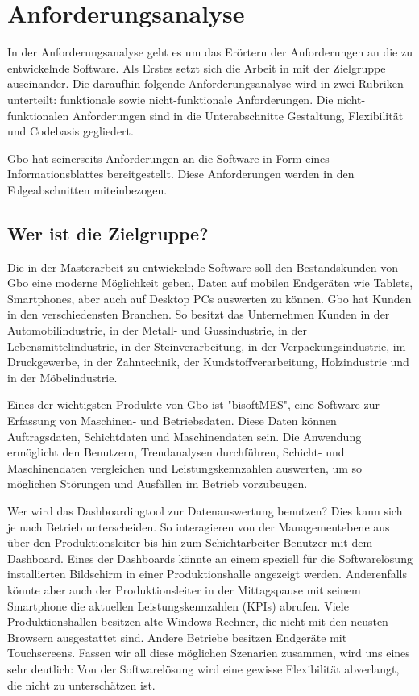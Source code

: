 \chapter{Anforderungsanalyse}
\label{chap:anforderungsanalyse}

In der Anforderungsanalyse geht es um das Erörtern der Anforderungen an die zu entwickelnde Software.
Als Erstes setzt sich die Arbeit in  mit der
Zielgruppe auseinander. Die daraufhin folgende Anforderungsanalyse wird in zwei
Rubriken unterteilt: funktionale sowie nicht-funktionale Anforderungen. Die
nicht-funktionalen Anforderungen sind in die Unterabschnitte Gestaltung, Flexibilität
und Codebasis gegliedert.

Gbo hat seinerseits Anforderungen an die Software in Form eines Informationsblattes
bereitgestellt. Diese Anforderungen werden in den Folgeabschnitten miteinbezogen.

\section{Wer ist die Zielgruppe?}
\label{sec:weristmeinezielgruppe}
Die in der Masterarbeit zu entwickelnde Software
soll den Bestandskunden von Gbo eine moderne Möglichkeit geben, Daten 
auf mobilen Endgeräten wie Tablets, Smartphones, aber auch auf Desktop PCs auswerten zu können.
Gbo hat Kunden in den verschiedensten Branchen. So besitzt das Unternehmen
Kunden in der Automobilindustrie, in der Metall- und Gussindustrie, in der Lebensmittelindustrie,
in der Steinverarbeitung, in der Verpackungsindustrie, im Druckgewerbe, in der
Zahntechnik, der Kundstoffverarbeitung, Holzindustrie und in der Möbelindustrie.\cite{GBODatacompBranchenloesungen}

Eines der wichtigsten Produkte von Gbo ist "bisoftMES", eine Software zur Erfassung von
Maschinen- und Betriebsdaten. Diese Daten können Auftragsdaten, Schichtdaten und Maschinendaten sein.
Die Anwendung ermöglicht den Benutzern, Trendanalysen durchführen, Schicht- und Maschinendaten vergleichen und
Leistungskennzahlen auswerten, um so möglichen Störungen und Ausfällen im Betrieb vorzubeugen.

Wer wird das Dashboardingtool zur Datenauswertung benutzen? Dies kann sich je nach Betrieb unterscheiden. So interagieren von der
Managementebene aus über den Produktionsleiter bis hin zum Schichtarbeiter Benutzer mit dem
Dashboard. Eines der Dashboards könnte an einem speziell für die Softwarelösung
installierten Bildschirm in einer Produktionshalle angezeigt werden. Anderenfalls könnte aber
auch der Produktionsleiter in der Mittagspause mit seinem Smartphone die aktuellen Leistungskennzahlen 
(KPIs) abrufen. Viele Produktionshallen besitzen alte Windows-Rechner, die nicht
mit den neusten Browsern ausgestattet sind. Andere Betriebe besitzen Endgeräte mit Touchscreens.
Fassen wir all diese möglichen Szenarien zusammen, wird uns eines sehr deutlich: Von der
Softwarelösung wird eine gewisse Flexibilität abverlangt, die nicht zu unterschätzen ist.

